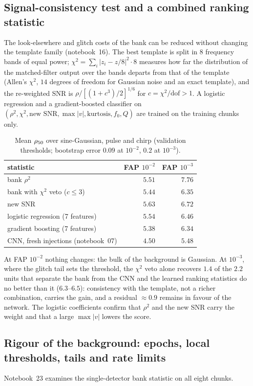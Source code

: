 \subsection{Signal-consistency test and a combined ranking statistic}\label{sec:chi2}
The look-elsewhere and glitch costs of the bank can be reduced without changing the template family (notebook~16). The best template is split in $8$ frequency bands of equal power; $\chi^2=\sum_i|z_i-z/8|^2\cdot8$ measures how far the distribution of the matched-filter output over the bands departs from that of the template (Allen's $\chi^2$, $14$ degrees of freedom for Gaussian noise and an exact template), and the re-weighted SNR is $\rho/[(1+c^3)/2]^{1/6}$ for $c=\chi^2/\mathrm{dof}>1$. A logistic regression and a gradient-boosted classifier on $(\rho^2,\chi^2,\text{new SNR},\max|v|,\text{kurtosis},f_0,Q)$ are trained on the training chunks only.
\begin{table}[h]\centering\small
\begin{tabular}{lrr}
\toprule
statistic & FAP $10^{-2}$ & FAP $10^{-3}$\\
\midrule
bank $\rho^2$ & $5.51$ & $7.76$\\
bank with $\chi^2$ veto ($c\le3$) & $5.44$ & $6.35$\\
new SNR & $5.63$ & $6.72$\\
logistic regression (7 features) & $5.54$ & $6.46$\\
gradient boosting (7 features) & $5.38$ & $6.34$\\
\midrule
CNN, fresh injections (notebook~07) & $4.50$ & $5.48$\\
\bottomrule
\end{tabular}
\caption{Mean $\rho_{50}$ over sine-Gaussian, pulse and chirp (validation thresholds; bootstrap error $0.09$ at $10^{-2}$, $0.2$ at $10^{-3}$).}\label{tab:chi2}
\end{table}
At FAP $10^{-2}$ nothing changes: the bulk of the background is Gaussian. At $10^{-3}$, where the glitch tail sets the threshold, the $\chi^2$ veto alone recovers $1.4$ of the $2.2$ units that separate the bank from the CNN and the learned ranking statistics do no better than it ($6.3$--$6.5$): consistency with the template, not a richer combination, carries the gain, and a residual $\approx0.9$ remains in favour of the network. The logistic coefficients confirm that $\rho^2$ and the new SNR carry the weight and that a large $\max|v|$ lowers the score.

\subsection{Rigour of the background: epochs, local thresholds, tails and rate limits}\label{sec:bkgrigour}
Notebook~23 examines the single-detector bank statistic on all eight chunks.

